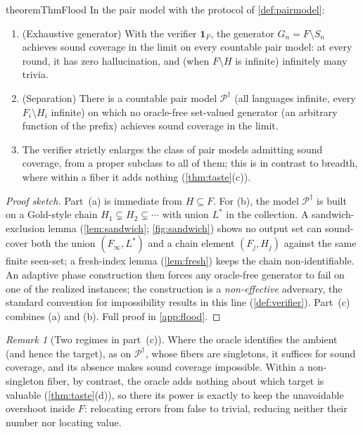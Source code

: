 \documentclass[11pt]{article}
\numberwithin{equation}{section}
\newcommand{\mc}[1]{\mathcal{#1}}
\newcommand{\Amb}{F}
\newcommand{\Val}{H}
\newcommand{\Pairs}{\mc{P}}
\newcommand{\Seen}{S}
\theoremstyle{plain}
\theoremstyle{definition}
\theoremstyle{remark}
\newtheorem{remark}[theorem]{Remark}
\begin{document}
\begin{restatable}{theorem}{ThmFlood}\label{thm:flood}
In the pair model with the protocol of \cref{def:pairmodel}:
\begin{enumerate}[label=\textup{(\alph*)}]
  \item \textup{(Exhaustive generator)} With the verifier $\mathbf 1_{\Amb}$, the generator
    $G_n = \Amb \setminus \Seen_n$ achieves sound coverage in the limit on every countable
    pair model: at every round, it has zero hallucination, and (when $\Amb \setminus \Val$ is
    infinite) infinitely many trivia.
  \item \textup{(Separation)} There is a countable pair model $\Pairs^{\dagger}$ (all
    languages infinite, every $\Amb_i \setminus \Val_i$ infinite) on which no oracle-free
    set-valued generator (an arbitrary function of the prefix) achieves sound coverage in the
    limit.
  \item The verifier strictly enlarges the class of pair models admitting sound coverage, from
    a proper subclass to all of them; this is in contrast to breadth, where within a fiber it
    adds nothing \textup{(\cref{thm:taste}(c))}.
\end{enumerate}
\end{restatable}

\begin{proof}[Proof sketch]
Part~(a) is immediate from $\Val \subseteq \Amb$. For (b), the model $\Pairs^{\dagger}$ is
built on a Gold-style chain $\Val_1 \subsetneq \Val_2 \subsetneq \cdots$ with union $L^*$ in
the collection. A sandwich-exclusion lemma (\cref{lem:sandwich}; \cref{fig:sandwich}) shows no
output set can sound-cover both the union $(\Amb_\infty, L^*)$ and a chain element $(\Amb_j,
\Val_j)$ against the same finite seen-set; a fresh-index lemma (\cref{lem:fresh}) keeps the
chain non-identifiable. An adaptive phase construction then forces any oracle-free generator
to fail on one of the realized instances; the construction is a \emph{non-effective}
adversary, the standard convention for impossibility results in this line
(\cref{def:verifier}). Part~(c) combines (a) and (b). Full proof in \cref{app:flood}.
\end{proof}

\begin{remark}[Two regimes in part~(c)]
Where the oracle identifies the ambient (and hence the target), as on $\Pairs^{\dagger}$,
whose fibers are singletons, it suffices for sound coverage, and its absence makes sound
coverage impossible. Within a non-singleton fiber, by contrast, the oracle adds nothing about
which target is valuable (\cref{thm:taste}(d)), so there its power is exactly to keep the
unavoidable overshoot inside $\Amb$: relocating errors from false to trivial, reducing neither
their number nor locating value.
\end{remark}
\end{document}
